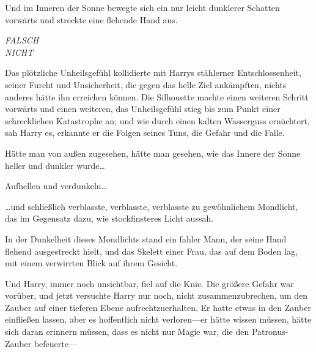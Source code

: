 Und im Inneren der Sonne bewegte sich ein nur leicht dunklerer Schatten vorwärts und streckte eine flehende Hand aus.

\emph{FALSCH\\
NICHT}

Das plötzliche Unheilsgefühl kollidierte mit Harrys stählerner Entschlossenheit, seiner Furcht und Unsicherheit, die gegen das helle Ziel ankämpften, nichts anderes hätte ihn erreichen können. Die Silhouette machte einen weiteren Schritt vorwärts und einen weiteren, das Unheilsgefühl stieg bis zum Punkt einer schrecklichen Katastrophe an; und wie durch einen kalten Wasserguss ernüchtert, sah Harry es, erkannte er die Folgen seines Tuns, die Gefahr und die Falle.

Hätte man von außen zugesehen, hätte man gesehen, wie das Innere der Sonne heller und dunkler wurde…

Aufhellen und verdunkeln…

…und schließlich verblasste, verblasste, verblasste zu gewöhnlichem Mondlicht, das im Gegensatz dazu, wie stockfinsteres Licht aussah.

In der Dunkelheit dieses Mondlichts stand ein fahler Mann, der seine Hand flehend ausgestreckt hielt, und das Skelett einer Frau, das auf dem Boden lag, mit einem verwirrten Blick auf ihrem Gesicht.

Und Harry, immer noch unsichtbar, fiel auf die Knie. Die größere Gefahr war vorüber, und jetzt versuchte Harry nur noch, nicht zusammenzubrechen, um den Zauber auf einer tieferen Ebene aufrechtzuerhalten. Er hatte etwas in den Zauber einfließen lassen, aber es hoffentlich nicht verloren—er hätte wissen müssen, hätte sich daran erinnern müssen, dass es nicht nur Magie war, die den Patronus-Zauber befeuerte—

